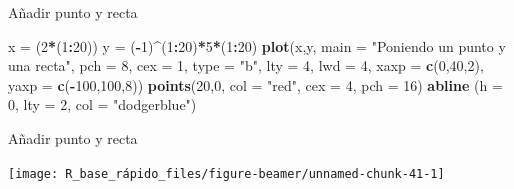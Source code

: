 \documentclass[
  ignorenonframetext,
  aspectratio=169]{beamer}
\newenvironment{Shaded}{\begin{snugshade}}{\end{snugshade}}
\newcommand{\AttributeTok}[1]{\textcolor[rgb]{0.13,0.29,0.53}{#1}}
\newcommand{\DecValTok}[1]{\textcolor[rgb]{0.00,0.00,0.81}{#1}}
\newcommand{\FunctionTok}[1]{\textcolor[rgb]{0.13,0.29,0.53}{\textbf{#1}}}
\newcommand{\NormalTok}[1]{#1}
\newcommand{\OtherTok}[1]{\textcolor[rgb]{0.56,0.35,0.01}{#1}}
\newcommand{\SpecialCharTok}[1]{\textcolor[rgb]{0.81,0.36,0.00}{\textbf{#1}}}
\newcommand{\StringTok}[1]{\textcolor[rgb]{0.31,0.60,0.02}{#1}}
\begin{document}
\begin{frame}[fragile]{Añadir punto y recta}
\label{auxf1adir-punto-y-recta}
\begin{Shaded}
\begin{Highlighting}[]
\NormalTok{x }\OtherTok{=}\NormalTok{ (}\DecValTok{2}\SpecialCharTok{*}\NormalTok{(}\DecValTok{1}\SpecialCharTok{:}\DecValTok{20}\NormalTok{))}
\NormalTok{y }\OtherTok{=}\NormalTok{ (}\SpecialCharTok{{-}}\DecValTok{1}\NormalTok{)}\SpecialCharTok{\^{}}\NormalTok{(}\DecValTok{1}\SpecialCharTok{:}\DecValTok{20}\NormalTok{)}\SpecialCharTok{*}\DecValTok{5}\SpecialCharTok{*}\NormalTok{(}\DecValTok{1}\SpecialCharTok{:}\DecValTok{20}\NormalTok{)}
\FunctionTok{plot}\NormalTok{(x,y, }\AttributeTok{main =} \StringTok{"Poniendo un punto y una recta"}\NormalTok{, }\AttributeTok{pch =} \DecValTok{8}\NormalTok{,}
     \AttributeTok{cex =} \DecValTok{1}\NormalTok{, }\AttributeTok{type =} \StringTok{"b"}\NormalTok{, }\AttributeTok{lty =} \DecValTok{4}\NormalTok{, }
     \AttributeTok{lwd =} \DecValTok{4}\NormalTok{, }\AttributeTok{xaxp =} \FunctionTok{c}\NormalTok{(}\DecValTok{0}\NormalTok{,}\DecValTok{40}\NormalTok{,}\DecValTok{2}\NormalTok{), }\AttributeTok{yaxp =} \FunctionTok{c}\NormalTok{(}\SpecialCharTok{{-}}\DecValTok{100}\NormalTok{,}\DecValTok{100}\NormalTok{,}\DecValTok{8}\NormalTok{))}
\FunctionTok{points}\NormalTok{(}\DecValTok{20}\NormalTok{,}\DecValTok{0}\NormalTok{, }\AttributeTok{col =} \StringTok{"red"}\NormalTok{, }\AttributeTok{cex =} \DecValTok{4}\NormalTok{, }\AttributeTok{pch =} \DecValTok{16}\NormalTok{)}
\FunctionTok{abline}\NormalTok{ (}\AttributeTok{h =} \DecValTok{0}\NormalTok{, }\AttributeTok{lty =} \DecValTok{2}\NormalTok{, }\AttributeTok{col =} \StringTok{"dodgerblue"}\NormalTok{)}
\end{Highlighting}
\end{Shaded}
\end{frame}

\begin{frame}{Añadir punto y recta}
\label{auxf1adir-punto-y-recta-1}
\begin{center}\texttt{[image: R\_base\_rápido\_files/figure-beamer/unnamed-chunk-41-1]} \end{center}
\end{frame}
\end{document}
